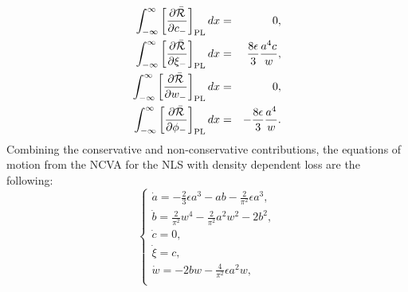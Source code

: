 {\begin{eqnarray}
\int_{-\infty}^{\infty} \left[ \frac{\partial  \bar{\mathcal{R}}}{\partial c_-} \right]_{\rm PL} dx &=& 0, \nonumber \\
\int_{-\infty}^{\infty} \left[ \frac{\partial  \bar{\mathcal{R}}}{\partial \xi_-} \right]_{\rm PL} dx &=&  \frac{8\epsilon}{3}   \frac{a^4 c }{w},\nonumber \\
\int_{-\infty}^{\infty} \left[ \frac{\partial  \bar{\mathcal{R}}}{\partial w_-} \right]_{\rm PL} dx &=& 0, \nonumber \\
\int_{-\infty}^{\infty} \left[ \frac{\partial  \bar{\mathcal{R}}}{\partial \phi_-} \right]_{\rm PL} dx &=&  -\frac{8\epsilon}{3}   \frac{a^4}{w}.\nonumber
\end{eqnarray}
Combining the conservative and non-conservative contributions, the equations of motion from the NCVA for the NLS with density dependent loss are the following:
%
{ 
\begin{equation}
\begin{cases}
  \dot{a} = - \frac{2}{3} \epsilon a^3   - a b - \frac{2}{\pi^2} \epsilon a^3, \\[1.0ex]
\dot{b}  = \frac{2}{\pi^2}w^4 - \frac{2}{\pi^2}a^2 w^2 - 2 b^2, \\[1.0ex]
\dot{c} = 0 , \\[1.0ex]
\dot{\xi} = c, \\[1.0ex]
\dot{w} = -2bw - \frac{4}{\pi^2} \epsilon a^2 w, \\[1.0ex]

\end{cases}
\end{equation}}}
